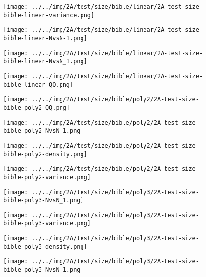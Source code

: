 \begin{figure}[H]
\centering	\texttt{[image: ../../img/2A/test/size/bible/linear/2A-test-size-bible-linear-variance.png]}
\end{figure}
\begin{figure}[H]
\centering	\texttt{[image: ../../img/2A/test/size/bible/linear/2A-test-size-bible-linear-NvsN-1.png]}
\end{figure}
\begin{figure}[H]
\centering	\texttt{[image: ../../img/2A/test/size/bible/linear/2A-test-size-bible-linear-NvsN\_1.png]}
\end{figure}
\begin{figure}[H]
\centering	\texttt{[image: ../../img/2A/test/size/bible/linear/2A-test-size-bible-linear-QQ.png]}
\end{figure}
\begin{figure}[H]
\centering	\texttt{[image: ../../img/2A/test/size/bible/poly2/2A-test-size-bible-poly2-QQ.png]}
\end{figure}
\begin{figure}[H]
\centering	\texttt{[image: ../../img/2A/test/size/bible/poly2/2A-test-size-bible-poly2-NvsN-1.png]}
\end{figure}
\begin{figure}[H]
\centering	\texttt{[image: ../../img/2A/test/size/bible/poly2/2A-test-size-bible-poly2-density.png]}
\end{figure}
\begin{figure}[H]
\centering	\texttt{[image: ../../img/2A/test/size/bible/poly2/2A-test-size-bible-poly2-variance.png]}
\end{figure}
\begin{figure}[H]
\centering	\texttt{[image: ../../img/2A/test/size/bible/poly3/2A-test-size-bible-poly3-NvsN\_1.png]}
\end{figure}
\begin{figure}[H]
\centering	\texttt{[image: ../../img/2A/test/size/bible/poly3/2A-test-size-bible-poly3-variance.png]}
\end{figure}
\begin{figure}[H]
\centering	\texttt{[image: ../../img/2A/test/size/bible/poly3/2A-test-size-bible-poly3-density.png]}
\end{figure}
\begin{figure}[H]
\centering	\texttt{[image: ../../img/2A/test/size/bible/poly3/2A-test-size-bible-poly3-NvsN-1.png]}
\end{figure}
